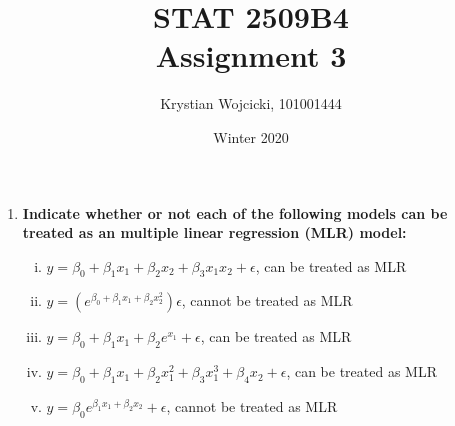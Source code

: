\documentclass{article}
\title{STAT 2509B4 \\
	\large{Assignment 3}}
\author{Krystian Wojcicki, 101001444}
\date{Winter 2020}
\begin{document}
\maketitle

\begin{enumerate}[1.]

\item
\textbf{Indicate whether or not each of the following models can be treated as an multiple linear
regression (MLR) model:}
\begin{enumerate}[(i)]
\item  $y = \beta_0 + \beta_1x_1 + \beta_2x_2 + \beta_3x_1x_2 + \epsilon $, can be treated as MLR
\item  $y = (e^{\beta_0 + \beta_1x_1 + \beta_2x_2^2})\epsilon$, cannot be treated as MLR
\item  $y = \beta_0 + \beta_1x_1 + \beta_2e^{x_1} + \epsilon$, can be treated as MLR
\item  $y = \beta_0 + \beta_1x_1 + \beta_2x_1^2 + \beta_3x_1^3 + \beta_4x_2 + \epsilon$, can be treated as MLR
\item $y = \beta_0e^{\beta_1x_1 + \beta_2x_2} + \epsilon$, cannot be treated as MLR
\end{enumerate}


\end{enumerate}
\end{document}
